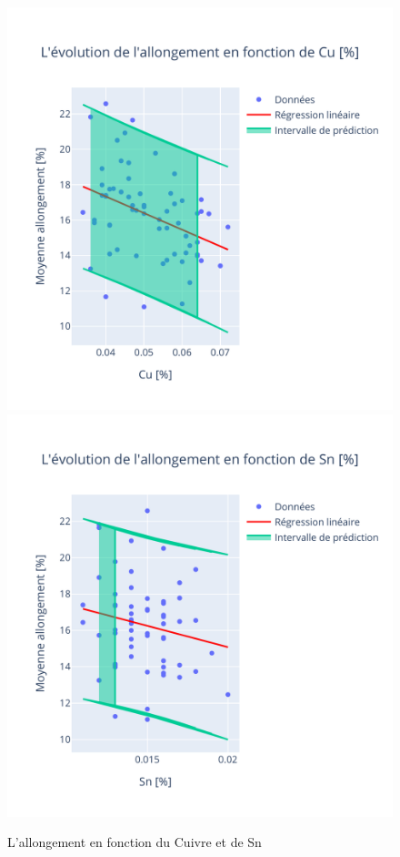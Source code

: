 \documentclass[12pt]{article}
\begin{document}
\begin{figure}[H]
    \centering
    \begin{adjustbox}{width=1.35\textwidth,center}
        \includegraphics[scale=1]{Images/Statistique/Regression_Cu_Allongement.pdf}
        \includegraphics[scale=1]{Images/Statistique/Regression_Sn_Allongement.pdf}
    \end{adjustbox}
    \caption{L'allongement en fonction du Cuivre et  de Sn }
    \label{fig:regression3}
\end{figure}
\end{document}
